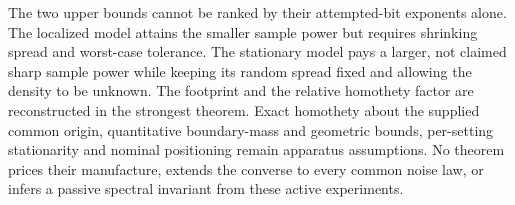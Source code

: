 The two upper bounds cannot be ranked by their attempted-bit exponents
alone. The localized model attains the smaller sample power but requires
shrinking spread and worst-case tolerance. The stationary model pays a
larger, not claimed sharp sample power while keeping its random spread
fixed and allowing the density to be unknown. The footprint and the
relative homothety factor are reconstructed in the strongest theorem.
Exact homothety about the supplied common origin, quantitative
boundary-mass and geometric bounds, per-setting stationarity and
nominal positioning remain apparatus assumptions. No theorem prices their manufacture,
extends the converse to every common noise law, or infers a passive
spectral invariant from these active experiments.
